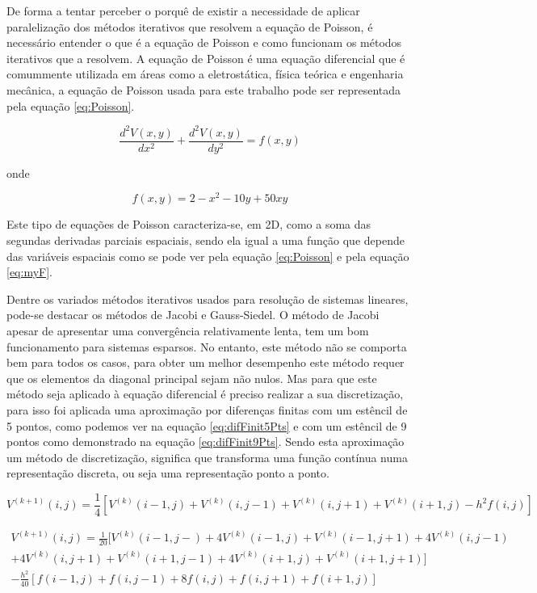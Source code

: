 \documentclass[10pt]{extarticle}
\begin{document}
 De forma a tentar perceber o porquê de existir a necessidade de aplicar paralelização dos métodos iterativos que resolvem a equação de Poisson, é necessário entender o que é a equação de Poisson e como funcionam os métodos iterativos que a resolvem. A equação de Poisson é uma equação diferencial que é comummente utilizada em áreas como a eletrostática, física teórica e engenharia mecânica, a equação de Poisson usada para este trabalho pode ser representada pela equação \ref{eq:Poisson}.
 
 \begin{equation} \label{eq:Poisson}
 \frac{d^2V(x,y)}{dx^2}+\frac{d^2V(x,y)}{dy^2}=f(x,y)
 \end{equation}
		
onde

 \begin{equation} \label{eq:myF}
 f(x,y)=2-x^2-10y+50xy
 \end{equation}
 
Este tipo de equações de Poisson caracteriza-se, em 2D, como a soma das segundas derivadas parciais espaciais, sendo ela igual a uma função que depende das variáveis espaciais como se pode ver pela equação \ref{eq:Poisson} e pela equação \ref{eq:myF}.

Dentre os variados métodos iterativos usados para resolução de sistemas lineares, pode-se destacar os métodos de Jacobi e Gauss-Siedel. O método de Jacobi apesar de apresentar uma convergência relativamente lenta, tem um bom funcionamento para sistemas esparsos. No entanto, este método não se comporta bem para todos os casos, para obter um melhor desempenho este método requer que os elementos da diagonal principal sejam não nulos. Mas para que este método seja aplicado à equação diferencial é preciso realizar a sua discretização, para isso foi aplicada uma aproximação por diferenças finitas com um estêncil de 5 pontos, como podemos ver na equação \ref{eq:difFinit5Pts} e com um estêncil de 9 pontos como demonstrado na equação \ref{eq:difFinit9Pts}. Sendo esta aproximação um método de discretização, significa que transforma uma função contínua numa representação discreta, ou seja uma representação ponto a ponto.

  \begin{equation}  \label{eq:difFinit5Pts}
  V^{(k+1)}(i,j)=\frac{1}{4}[V^{(k)}(i-1,j)+V^{(k)}(i,j-1)+V^{(k)}(i,j+1)     	                +V^{(k)}(i+1,j)-h^2f(i,j)]
  \end{equation}
		
  \begin{equation}  \label{eq:difFinit9Pts}	
  \begin{aligned}
  V^{(k+1)}(i,j)=\frac{1}{20}[V^{(k)}(i-1,j-)+4V^{(k)}(i-1,j)+V^{(k)}(i-1,j+1)     	                +4V^{(k)}(i,j-1)\\+4V^{(k)}(i,j+1)+V^{(k)}(i+1,j-1)
                    +4V^{(k)}(i+1,j)+V^{(k)}(i+1,j+1)]\\-\frac{h^2}{40}[f(i-1,j)                                                                              	                +f(i,j-1)+8f(i,j)+f(i,j+1)+f(i+1,j)]
  \end{aligned}
  \end{equation}
  
\end{document}
